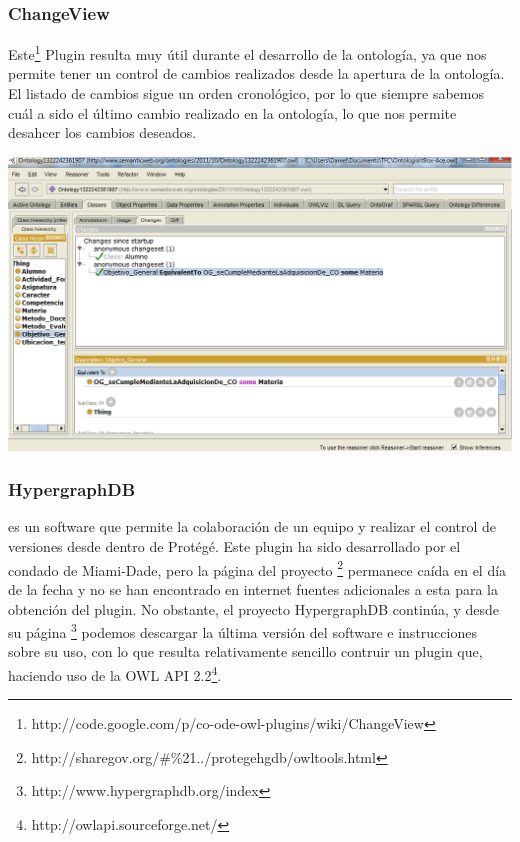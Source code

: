 \subsubsection{ChangeView} Este\footnote{http://code.google.com/p/co-ode-owl-plugins/wiki/ChangeView} Plugin resulta muy útil durante el desarrollo de la ontología, ya que nos permite tener un control de cambios realizados desde la apertura de la ontología. El listado de cambios sigue un orden cronológico, por lo que siempre sabemos cuál a sido el último cambio realizado en la ontología, lo que nos permite desahcer los cambios deseados.

\begin{center}
		\includegraphics[width=1.00\textwidth]{Imagenes/Herramientas-changeview.png}
\end{center}

\subsubsection{HypergraphDB} es un software que permite la colaboración de un equipo y realizar el control de versiones desde dentro de Protégé. Este plugin ha sido desarrollado por el condado de Miami-Dade, pero la página del proyecto \footnote{http://sharegov.org/\#\%21../protegehgdb/owltools.html} permanece caída en el día de la fecha y no se han encontrado en internet fuentes adicionales a esta para la obtención del plugin. No obstante, el proyecto HypergraphDB continúa, y desde su página \footnote{http://www.hypergraphdb.org/index} podemos descargar la última versión del software e instrucciones sobre su uso, con lo que resulta relativamente sencillo contruir un plugin que, haciendo uso de la OWL API 2.2\footnote{http://owlapi.sourceforge.net/}.


